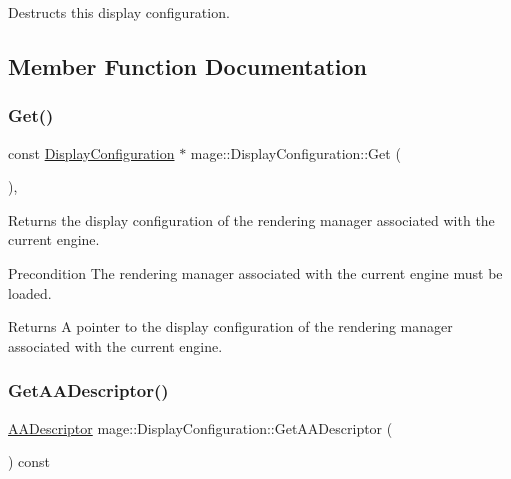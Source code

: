 Destructs this display configuration. 

\subsection{Member Function Documentation}
\hypertarget{structmage_1_1_display_configuration_a186aca1e5dabb6d819ff16c9aca6edfc}{}\label{structmage_1_1_display_configuration_a186aca1e5dabb6d819ff16c9aca6edfc} 
\subsubsection{\texorpdfstring{Get()}{Get()}}
{\footnotesize\ttfamily const \hyperlink{structmage_1_1_display_configuration}{Display\+Configuration} $\ast$ mage\+::\+Display\+Configuration\+::\+Get (\begin{DoxyParamCaption}{ }\end{DoxyParamCaption})\hspace{0.3cm}{\ttfamily [static]}, {\ttfamily [noexcept]}}

Returns the display configuration of the rendering manager associated with the current engine.

\begin{DoxyPrecond}{Precondition}
The rendering manager associated with the current engine must be loaded. 
\end{DoxyPrecond}
\begin{DoxyReturn}{Returns}
A pointer to the display configuration of the rendering manager associated with the current engine. 
\end{DoxyReturn}
\hypertarget{structmage_1_1_display_configuration_a8022cbb0f6df7250aae675cab32d68af}{}\label{structmage_1_1_display_configuration_a8022cbb0f6df7250aae675cab32d68af} 
\subsubsection{\texorpdfstring{Get\+A\+A\+Descriptor()}{GetAADescriptor()}}
{\footnotesize\ttfamily \hyperlink{namespacemage_a86cd40b8f2f42ca4d616cc6ec665a7f2}{A\+A\+Descriptor} mage\+::\+Display\+Configuration\+::\+Get\+A\+A\+Descriptor (\begin{DoxyParamCaption}{ }\end{DoxyParamCaption}) const\hspace{0.3cm}{\ttfamily [noexcept]}}


